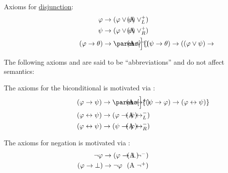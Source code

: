\begin{definition}
\begin{thmenum}[series=def:minimal_propositional_derivation_system]
     Axioms for \hyperref[def:propositional_language/connectives/disjunction]{disjunction}:
    \begin{align}
      \mathllap{ \varphi }                      &\rightarrow \mathrlap{ (\varphi \vee \psi) } \tag{\textrm{A} \( \vee_L^+ \)} \label{eq:def:minimal_propositional_derivation_system/or/intro_left} \\
      \mathllap{ \psi }                      &\rightarrow \mathrlap{ (\varphi \vee \psi) } \tag{\textrm{A} \( \vee_R^+ \)} \label{eq:def:minimal_propositional_derivation_system/or/intro_right} \\
      \mathllap{ (\varphi \rightarrow \theta) } &\rightarrow \mathrlap{ \parens[\Big]{ (\psi \rightarrow \theta) \rightarrow ((\varphi \vee \psi) \rightarrow \theta) } } \tag{\textrm{A} \( \vee^- \)} \label{eq:def:minimal_propositional_derivation_system/or/elim}
    \end{align}
  \end{thmenum}

  The following axioms and are said to be \enquote{abbreviations} and do not affect semantics:
  \begin{thmenum}[resume=def:minimal_propositional_derivation_system]
     The axioms for the biconditional is motivated via :
    \begin{align}
      \mathllap{ (\varphi \rightarrow \psi)     } &\rightarrow \mathrlap{ \parens[\Big]{ (\psi \rightarrow \varphi) \rightarrow (\varphi \leftrightarrow \psi) } } \tag{\textrm{A} \( \leftrightarrow^+ \)} \label{def:minimal_propositional_derivation_system/iff/intro} \\
      \mathllap{ (\varphi \leftrightarrow \psi)  }&\rightarrow \mathrlap{ (\varphi \rightarrow \psi) } \tag{\textrm{A} \( \leftrightarrow_L^- \)} \label{eq:def:minimal_propositional_derivation_system/iff/elim_left} \\
      \mathllap{ (\varphi \leftrightarrow \psi) } &\rightarrow \mathrlap{ (\psi \rightarrow \varphi) } \tag{\textrm{A} \( \leftrightarrow_R^- \)} \label{eq:def:minimal_propositional_derivation_system/iff/elim_right}
    \end{align}

     The axioms for negation is motivated via :
    \begin{align}
      \mathllap{ \neg \varphi }               &\rightarrow \mathrlap{ (\varphi \rightarrow \bot) } \tag{\textrm{A} \( \neg^- \)} \label{eq:def:minimal_propositional_derivation_system/neg/elim} \\
      \mathllap{ (\varphi \rightarrow \bot) } &\rightarrow \mathrlap{ \neg \varphi } \tag{\textrm{A} \( \neg^+ \)} \label{eq:def:minimal_propositional_derivation_system/neg/intro}
    \end{align}
  \end{thmenum}
\end{definition}


